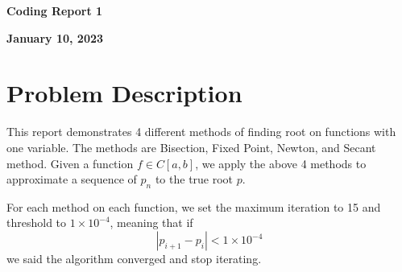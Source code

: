 \documentclass[a4paper,12pt]{article}
\begin{document}
\begin{center} %
	{\Large \bf Coding Report 1} %
	\vspace{2mm}
	
       
	{\bf January 10, 2023}
\end{center}  

\vspace{0.4cm}


\section{Problem Description}
This report demonstrates 4 different methods of finding root on functions with one variable.
The methods are Bisection, Fixed Point, Newton, and Secant method.
Given a function $f \in C[a, b]$, 
we apply the above 4 methods to approximate a sequence of $p_n$ to the true root $p$.

For each method on each function,
we set the maximum iteration to 15 and threshold to $1 \times 10^{-4}$,
meaning that if
$$
|p_{i+1} - p_{i}| < 1 \times 10^{-4}
$$
we said the algorithm converged and stop iterating.
\end{document}
